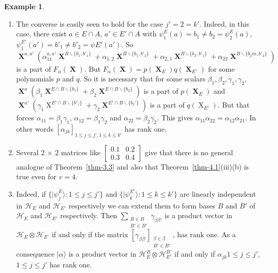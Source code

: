 \documentclass[a4paper,12pt]{article}
\DeclareMathOperator{\x}{\mathrm{X}}
\theoremstyle{definition}
\theoremstyle{underlinethm}
\newtheorem{example}{Example}[section]
\theoremstyle{definition}
\begin{document}
\begin{example}
\begin{enumerate}[label=(\roman*)]
\item The converse is easily seen to hold for the case $j'=2=k'$. Indeed, in this case, there exist $a \in E \cap A$, $a' \in E' \cap A$ with $\psi_{1}^{E}(a) = b_{1} \neq b_{2} = \psi_{2}^{E}(a)$, $\psi_{1}^{E'}(a') = b'_{1} \neq b'_{2} = \psi E'(a')$. So $\boldsymbol{\x}^{a,a'} (\alpha_{11}^{a,a'} \boldsymbol{\x}^{B \smallsetminus \{b_{1}, b'_{1}\}} + \alpha_{1, 2} \boldsymbol{\x}^{B\smallsetminus \{b_{1}, b'_{2}\}} + \alpha_{2, 1} \boldsymbol{\x}^{B\smallsetminus \{b_{2}, b'_{1}\}} + \alpha_{2 2} \boldsymbol{\x}^{B \smallsetminus \{b_{2}m, b'_{2}\}} )$  is a part of $F_{\alpha}(\boldsymbol{\x})$. But $F_{\alpha}(\boldsymbol{\x}) = p (\boldsymbol{\x}_{E})q(\boldsymbol{\x}_{E'})$ for some polynomials $p$ and $q$. So it is necessary that for some scalars $\beta_{1}, \beta_{2}, \gamma_{1}, \gamma_{2} $, $\boldsymbol{\x}^{a} \left(\beta_{1}\boldsymbol{\x}^{E \cap B \smallsetminus \{b_{1}\}} + \beta_{2} \boldsymbol{\x}^{E \cap B \smallsetminus\{b_{2}\}} \right)$ is a part of $p(\boldsymbol{\x}_{E})$ and\\ $\boldsymbol{\x}^{a'}(\gamma_{1} \x^{E'\cap B \smallsetminus \{b'_{1}\}} + \gamma_{2} \boldsymbol{\x}^{E'\cap B\smallsetminus \{b_{2}'\}})$ is a part of $q(\x_{E'})$. But that forces $\alpha_{11} = \beta_{1}\gamma_{1}$, $\alpha_{12}= \beta_{1} \gamma_{2}$ and $\alpha_{22}= \beta_{2}\gamma_{2}$. This gives $\alpha_{11} \alpha_{22} = \alpha_{12} \alpha_{21}$. In other words $[\alpha_{jk}]_{1 \leq j \leq j', 1 \leq k \leq k'}$ has rank one.

\item Several 2 $\times$ 2 matrices like $\begin{bmatrix}0.1 & 0.2\\0.3 & 0.4 \end{bmatrix}$ give that  there is no general analogue of Theorem~\eqref{thm-3.3} and also that Theorem~\eqref{thm-4.1}(iii)(b) is true even for $v=4$.

\item Indeed, if $\{| \psi_{j}^{E} \rangle : 1 \leq j \leq j' \}$ and $\{| \psi_{k}^{E'} \rangle : 1 \leq k \leq k'\}$ are linearly independent in $\mathcal{H}_{E}$ and $\mathcal{H}_{E'}$ respectively we can extend them to form bases $B$ and $B'$ of $\mathcal{H}_{E}$ and $\mathcal{H}_{E'}$ respectively. Then $\sum_{\substack{B \in B \\ B' \in B'}} \gamma_{\beta \beta'}$ is a product vector in $\mathcal{H}_{E}\otimes \mathcal{H}_{E'}$ if and only if the matrix $[\gamma_{\beta \beta'}]_{\substack{\beta \in \beta \\ B' \in B'}}$, has rank one. As a consequence $| \alpha \rangle$ is a product vector in $\mathcal{H}_{E}^{B} \otimes \mathcal{H}_{E'}^{B'}$ if and only if $\alpha_{jk} 1 \leq j \leq j'$, $1 \leq j \leq j'$ has rank one. 

\end{enumerate}
\end{example}
\end{document}
